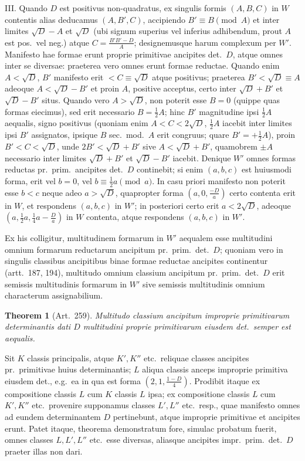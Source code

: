 \documentclass[12pt,a4paper]{article}
\theoremstyle{plain}
\newtheorem{theorem}{Theorem}[section]
\theoremstyle{definition}
\theoremstyle{remark}
\theoremstyle{problemstyle}
\begin{document}
III. Quando $D$ est positivus non-quadratus, ex singulis formis $(A, B, C)$ in $W$ contentis alias deducamus $(A, B', C)$, accipiendo $B' \equiv B \pmod{A}$ et inter limites $\sqrt{D} - A$ et $\sqrt{D}$ (ubi signum superius vel inferius adhibendum, prout $A$ est pos.\ vel neg.) atque $C = \frac{B'B' - D}{A}$; designemusque harum complexum per $W'$. Manifesto hae formae erunt proprie primitivae ancipites det.\ $D$, atque omnes inter se diversae: praeterea vero omnes erunt formae reductae. Quando enim $A < \sqrt{D}$, $B'$ manifesto erit $< C \equiv \sqrt{D}$ atque positivus; praeterea $B' < \sqrt{D} \equiv A$ adeoque $A < \sqrt{D} - B'$ et proin $A$, positive acceptus, certo inter $\sqrt{D} + B'$ et $\sqrt{D} - B'$ situs. Quando vero $A > \sqrt{D}$, non poterit esse $B = 0$ (quippe quas formas eiecimus), sed erit necessario $B = \tfrac{1}{2}A$; hinc $B'$ magnitudine ipsi $\tfrac{1}{2}A$ aequalis, signo positivus (quoniam enim $A < C < 2\sqrt{D}$, $\tfrac{1}{2}A$ iacebit inter limites ipsi $B'$ assignatos, ipsique $B$ sec.\ mod.\ $A$ erit congruus; quare $B' = +\tfrac{1}{2}A$), proin $B' < C < \sqrt{D}$, unde $2B' < \sqrt{D} + B'$ sive $A < \sqrt{D} + B'$, quamobrem $\pm A$ necessario inter limites $\sqrt{D} + B'$ et $\sqrt{D} - B'$ iacebit. Denique $W'$ omnes formas reductas pr.\ prim.\ ancipites det.\ $D$ continebit; si enim $(a, b, c)$ est huiusmodi forma, erit vel $b = 0$, vel $b \equiv \tfrac{1}{2}a \pmod{a}$. In casu priori manifesto non poterit esse $b < c$ neque adeo $a > \sqrt{D}$, quapropter forma $(a, 0, \frac{-D}{a})$ certo contenta erit in $W$, et respondens $(a, b, c)$ in $W'$; in posteriori certo erit $a < 2\sqrt{D}$, adeoque $(a, \tfrac{1}{2}a, \tfrac{1}{4}a - \frac{D}{a})$ in $W$ contenta, atque respondens $(a, b, c)$ in $W'$.

Ex his colligitur, multitudinem formarum in $W'$ aequalem esse multitudini omnium formarum reductarum ancipitum pr.\ prim.\ det.\ $D$; quoniam vero in singulis classibus ancipitibus binae formae reductae ancipites continentur (artt.\ 187, 194), multitudo omnium classium ancipitum pr.\ prim.\ det.\ $D$ erit semissis multitudinis formarum in $W'$ sive semissis multitudinis omnium characterum assignabilium.


\begin{theorem}[Art.\ 259]
Multitudo classium ancipitum improprie primitivarum determinantis dati $D$ multitudini proprie primitivarum eiusdem det.\ semper est aequalis.
\end{theorem}

Sit $K$ classis principalis, atque $K', K''$ etc.\ reliquae classes ancipites pr.\ primitivae huius determinantis; $L$ aliqua classis anceps improprie primitiva eiusdem det., e.g.\ ea in qua est forma $(2, 1, \frac{1 - D}{4})$. Prodibit itaque ex compositione classis $L$ cum $K$ classis $L$ ipsa; ex compositione classis $L$ cum $K', K''$ etc.\ provenire supponamus classes $L', L''$ etc.\ resp., quae manifesto omnes ad eundem determinantem $D$ pertinebunt, atque improprie primitivae et ancipites erunt. Patet itaque, theorema demonstratum fore, simulac probatum fuerit, omnes classes $L, L', L''$ etc.\ esse diversas, aliasque ancipites impr.\ prim.\ det.\ $D$ praeter illas non dari.
\end{document}
